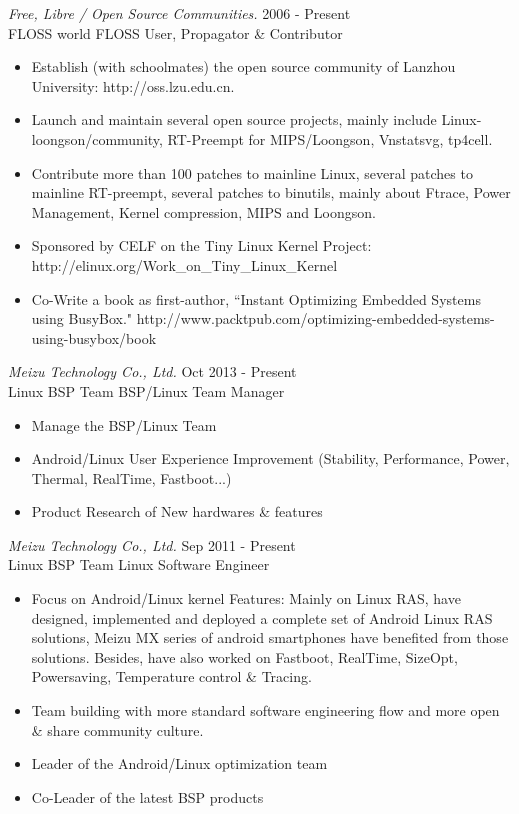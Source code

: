 \documentclass{res}
\begin{document}
\begin{resume}
{\sl Free, Libre / Open Source Communities. } \hfill	    2006 - Present \\
FLOSS world    \hfill  FLOSS User, Propagator \& Contributor

   \begin{itemize} \itemsep -2pt %
   \item Establish (with schoolmates) the open source community of Lanzhou University: http://oss.lzu.edu.cn.
   \item Launch and maintain several open source projects, mainly include Linux-loongson/community, RT-Preempt for MIPS/Loongson, Vnstatsvg, tp4cell.
   \item Contribute more than 100 patches to mainline Linux, several patches to mainline RT-preempt, several patches to binutils, mainly about Ftrace, Power Management, Kernel compression, MIPS and Loongson.
   \item Sponsored by CELF on the Tiny Linux Kernel Project: {\small http://elinux.org/Work\_on\_Tiny\_Linux\_Kernel}
   \item Co-Write a book as first-author, ``Instant Optimizing Embedded Systems using BusyBox." {\small http://www.packtpub.com/optimizing-embedded-systems-using-busybox/book}
 \end{itemize}

{\sl Meizu Technology Co., Ltd. } \hfill	Oct 2013 - Present \\
Linux BSP Team	  \hfill  BSP/Linux Team Manager

   \begin{itemize} \itemsep -2pt %
   \item Manage the BSP/Linux Team
   \item Android/Linux User Experience Improvement (Stability, Performance, Power, Thermal, RealTime, Fastboot...)
   \item Product Research of New hardwares \& features
   \end{itemize}

{\sl Meizu Technology Co., Ltd. } \hfill	Sep 2011 - Present \\
Linux BSP Team	  \hfill  Linux Software Engineer

   \begin{itemize} \itemsep -2pt %
   \item Focus on Android/Linux kernel Features: Mainly on Linux RAS, have designed, implemented and deployed a complete set of Android Linux RAS solutions, Meizu MX series of android smartphones have benefited from those solutions. Besides, have also worked on Fastboot, RealTime, SizeOpt, Powersaving, Temperature control \& Tracing.
   \item Team building with more standard software engineering flow and more open \& share community culture.
   \item Leader of the Android/Linux optimization team
   \item Co-Leader of the latest BSP products
 \end{itemize}


\end{resume}
\end{document}
